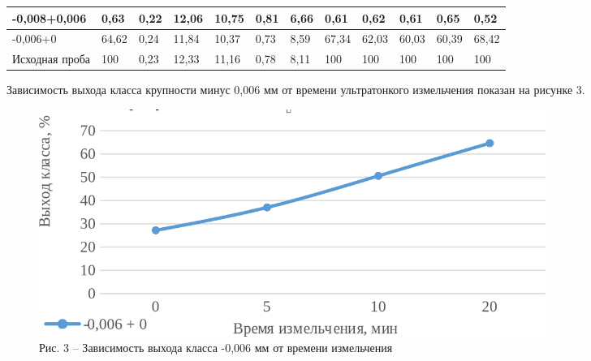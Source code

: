 {\begin{longtable}[c]{|p{}lllllllllll|}
\multicolumn{1}{|l|}{-0,008+0,006} & \multicolumn{1}{l|}{0,63} & \multicolumn{1}{l|}{0,22} & \multicolumn{1}{l|}{12,06} & \multicolumn{1}{l|}{10,75} & \multicolumn{1}{l|}{0,81} & \multicolumn{1}{l|}{6,66} & \multicolumn{1}{l|}{0,61} & \multicolumn{1}{l|}{0,62} & \multicolumn{1}{l|}{0,61} & \multicolumn{1}{l|}{0,65} & 0,52 \\ \hline
\multicolumn{1}{|l|}{-0,006+0} & \multicolumn{1}{l|}{64,62} & \multicolumn{1}{l|}{0,24} & \multicolumn{1}{l|}{11,84} & \multicolumn{1}{l|}{10,37} & \multicolumn{1}{l|}{0,73} & \multicolumn{1}{l|}{8,59} & \multicolumn{1}{l|}{67,34} & \multicolumn{1}{l|}{62,03} & \multicolumn{1}{l|}{60,03} & \multicolumn{1}{l|}{60,39} & 68,42 \\ \hline
\multicolumn{1}{|l|}{Исходная проба} & \multicolumn{1}{l|}{100} & \multicolumn{1}{l|}{0,23} & \multicolumn{1}{l|}{12,33} & \multicolumn{1}{l|}{11,16} & \multicolumn{1}{l|}{0,78} & \multicolumn{1}{l|}{8,11} & \multicolumn{1}{l|}{100} & \multicolumn{1}{l|}{100} & \multicolumn{1}{l|}{100} & \multicolumn{1}{l|}{100} & 100 \\ \hline
\end{longtable}}

Зависимость выхода класса крупности минус 0,006 мм от времени
ультратонкого измельчения показан на рисунке 3.

\begin{figure}[H]
	\centering
	\includegraphics[width=0.8\textwidth]{assets/300.1}
	\caption*{Рис. 3 -- Зависимость выхода класса -0,006 мм от времени измельчения}
\end{figure}


